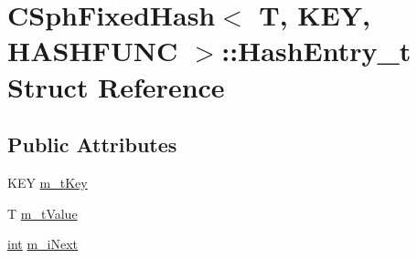 \hypertarget{structCSphFixedHash_1_1HashEntry__t}{\section{C\-Sph\-Fixed\-Hash$<$ T, K\-E\-Y, H\-A\-S\-H\-F\-U\-N\-C $>$\-:\-:Hash\-Entry\-\_\-t Struct Reference}
\label{structCSphFixedHash_1_1HashEntry__t}
}
\subsection*{Public Attributes}
\begin{DoxyCompactItemize}
\item 
K\-E\-Y \hyperlink{structCSphFixedHash_1_1HashEntry__t_a29fb153aa93dcdf5f20a5c1d04523359}{m\-\_\-t\-Key}
\item 
T \hyperlink{structCSphFixedHash_1_1HashEntry__t_a2f3dd7f47fea203cd2bae049634c7de3}{m\-\_\-t\-Value}
\item 
\hyperlink{sphinxexpr_8cpp_a4a26e8f9cb8b736e0c4cbf4d16de985e}{int} \hyperlink{structCSphFixedHash_1_1HashEntry__t_aef4b78c55adb55bda3200617ef2cfd96}{m\-\_\-i\-Next}
\end{DoxyCompactItemize}


